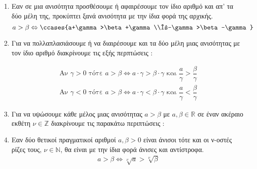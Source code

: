 \documentclass[twoside,10pt]{book}
\begin{document}
\begin{enumerate}
\item Εαν σε μια ανισότητα προσθέσουμε ή αφαιρέσουμε τον ίδιο αριθμό και απ' τα δύο μέλη της, προκύπτει ξανά ανισότητα με την ίδια φορά της αρχικής.
\[ a>\beta\Leftrightarrow\ccases{a+\gamma>\beta+\gamma\\α-\gamma>\beta-\gamma} \]
\item Για να πολλαπλασιάσουμε ή να διαιρέσουμε και τα δύο μέλη μιας ανισότητας με τον ίδιο αριθμό διακρίνουμε τις εξής περπτώσεις :
\begin{gather*}
\textrm{Αν }\gamma>0\textrm{ τότε }a>\beta\Leftrightarrow a\cdot\gamma>\beta\cdot\gamma\textrm{ και }\dfrac{a}{\gamma}>\dfrac{\beta}{\gamma}\\
\textrm{Αν }\gamma<0\textrm{ τότε }a>\beta\Leftrightarrow a\cdot\gamma<\beta\cdot\gamma\textrm{ και }\dfrac{a}{\gamma}<\dfrac{\beta}{\gamma}
\end{gather*}
\item Για να υψώσουμε κάθε μέλος μιας ανισότητας $ a>\beta $ με $ a,\beta\in\mathbb{R} $ σε έναν ακέραιο εκθέτη $ \nu\in\mathbb{Z} $ διακρίνουμε τις παρακάτω περιπτώσεις :
\item Εαν δύο θετικοί πραγματικοί αριθμοί $ a,\beta>0 $ είναι άνισοι τότε και οι ν-οστές ρίζες τους, $ \nu\in\mathbb{N} $, θα είναι με την ίδια φορά άνισες και αντίστροφα.
\begin{gather*}
a>\beta\Leftrightarrow\sqrt[\nu]{a}>\!\sqrt[\nu]{\beta}
\end{gather*}
\end{enumerate}
\end{document}
